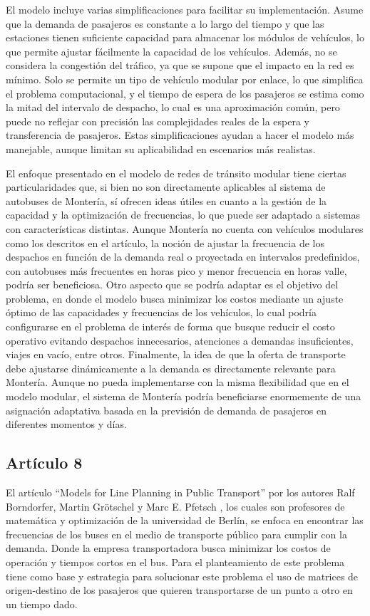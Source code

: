 \documentclass[preprint,11pt]{elsarticle}
\begin{document}
El modelo incluye varias simplificaciones para facilitar su implementación. Asume que la demanda de pasajeros es constante a lo largo del tiempo y que las estaciones tienen suficiente capacidad para almacenar los módulos de vehículos, lo que permite ajustar fácilmente la capacidad de los vehículos. Además, no se considera la congestión del tráfico, ya que se supone que el impacto en la red es mínimo. Solo se permite un tipo de vehículo modular por enlace, lo que simplifica el problema computacional, y el tiempo de espera de los pasajeros se estima como la mitad del intervalo de despacho, lo cual es una aproximación común, pero puede no reflejar con precisión las complejidades reales de la espera y transferencia de pasajeros. Estas simplificaciones ayudan a hacer el modelo más manejable, aunque limitan su aplicabilidad en escenarios más realistas.

El enfoque presentado en el modelo de redes de tránsito modular tiene ciertas particularidades que, si bien no son directamente aplicables al sistema de autobuses de Montería, sí ofrecen ideas útiles en cuanto a la gestión de la capacidad y la optimización de frecuencias, lo que puede ser adaptado a sistemas con características distintas. Aunque Montería no cuenta con vehículos modulares como los descritos en el artículo, la noción de ajustar la frecuencia de los despachos en función de la demanda real o proyectada en intervalos predefinidos, con autobuses más frecuentes en horas pico y menor frecuencia en horas valle, podría ser beneficiosa. Otro aspecto que se podría adaptar es el objetivo del problema, en donde el modelo busca minimizar los costos mediante un ajuste óptimo de las capacidades y frecuencias de los vehículos, lo cual podría configurarse en el problema de interés de forma que busque reducir el costo operativo evitando despachos innecesarios, atenciones a demandas insuficientes, viajes en vacío, entre otros. Finalmente, la idea de que la oferta de transporte debe ajustarse dinámicamente a la demanda es directamente relevante para Montería. Aunque no pueda implementarse con la misma flexibilidad que en el modelo modular, el sistema de Montería podría beneficiarse enormemente de una asignación adaptativa basada en la previsión de demanda de pasajeros en diferentes momentos y días.

\subsection*{Artículo 8}


El artículo “Models for Line Planning in Public Transport” por los autores Ralf Borndorfer, Martin Grötschel y Marc E. Pfetsch \cite{borndorfer2005}, los cuales son profesores de matemática y optimización de la universidad de Berlín, se enfoca en encontrar las frecuencias de los buses en el medio de transporte público para cumplir con la demanda. Donde la empresa transportadora busca minimizar los costos de operación y tiempos cortos en el bus. Para el planteamiento de este problema tiene como base y estrategia para solucionar este problema el uso de matrices de origen-destino de los pasajeros que quieren transportarse de un punto a otro en un tiempo dado.
\end{document}
